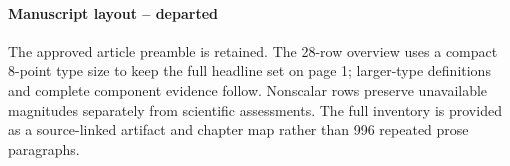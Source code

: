 \documentclass[11pt]{article}
\begin{document}
\paragraph{Manuscript layout -- departed}
The approved article preamble is retained. The 28-row overview uses a compact 8-point type size to keep the full headline set on page 1; larger-type definitions and complete component evidence follow. Nonscalar rows preserve unavailable magnitudes separately from scientific assessments. The full inventory is provided as a source-linked artifact and chapter map rather than 996 repeated prose paragraphs.


\end{document}
